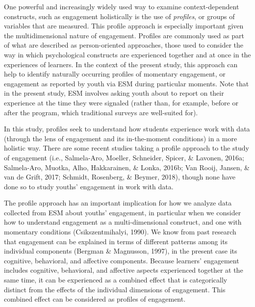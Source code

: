 \documentclass[]{book}
\theoremstyle{definition}
\theoremstyle{definition}
\theoremstyle{definition}
\theoremstyle{remark}
\begin{document}
One powerful and increasingly widely used way to examine
context-dependent constructs, such as engagement holistically is the use
of \emph{profiles}, or groups of variables that are measured. This
profile approach is especially important given the multidimensional
nature of engagement. Profiles are commonly used as part of what are
described as person-oriented approaches, those used to consider the way
in which psychological constructs are experienced together and at once
in the experiences of learners. In the context of the present study,
this approach can help to identify naturally occurring profiles of
momentary engagement, or engagement as reported by youth via ESM during
particular moments. Note that in the present study, ESM involves asking
youth about to report on their experience at the time they were signaled
(rather than, for example, before or after the program, which
traditional surveys are well-suited for).

In this study, profiles seek to understand how students experience work
with data (through the lens of engagement and its in-the-moment
conditions) in a more holistic way. There are some recent studies taking
a profile approach to the study of engagement (i.e., Salmela-Aro,
Moeller, Schneider, Spicer, \& Lavonen, 2016a; Salmela-Aro, Muotka,
Alho, Hakkarainen, \& Lonka, 2016b; Van Rooij, Jansen, \& van de Grift,
2017; Schmidt, Rosenberg, \& Beymer, 2018), though none have done so to
study youths' engagement in work with data.

The profile approach has an important implication for how we analyze
data collected from ESM about youths' engagement, in particular when we
consider how to understand engagement as a multi-dimensional construct,
and one with momentary conditions (Csikszentmihalyi, 1990). We know from
past research that engagement can be explained in terms of different
patterns among its individual components (Bergman \& Magnusson, 1997),
in the present case its cognitive, behavioral, and affective components.
Because learners' engagement includes cognitive, behavioral, and
affective aspects experienced together at the same time, it can be
experienced as a combined effect that is categorically distinct from the
effects of the individual dimensions of engagement. This combined effect
can be considered as profiles of engagement.
\end{document}
